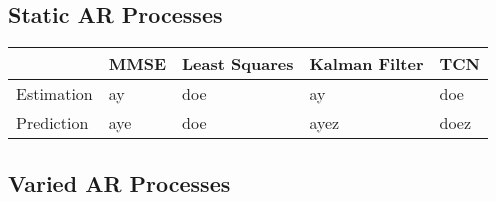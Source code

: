 \documentclass[twocolumn,letterpaper]{IEEEAerospaceCLS}  %
\begin{document}
\subsection{Static AR Processes}

\begin{table}[!h]
\begin{tabular}{|l|l|l|l|l|}
\hline
                            & MMSE                 & Least Squares        & Kalman Filter         & TCN                   \\ \hline
\multirow{3}{*}{Estimation} & \multirow{3}{*}{ay}  & \multirow{3}{*}{doe} & \multirow{3}{*}{ay}   & \multirow{3}{*}{doe}  \\
                            &                      &                      &                       &                       \\
                            &                      &                      &                       &                       \\ \hline
\multirow{3}{*}{Prediction} & \multirow{3}{*}{aye} & \multirow{3}{*}{doe} & \multirow{3}{*}{ayez} & \multirow{3}{*}{doez} \\
                            &                      &                      &                       &                       \\
                            &                      &                      &                       &                       \\ \hline
\end{tabular}
\end{table}


\subsection{Varied AR Processes}
\end{document}
